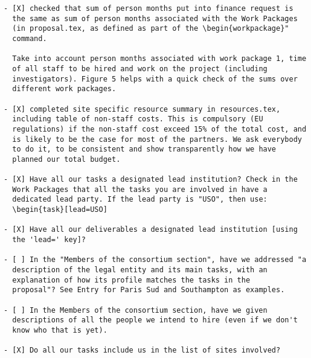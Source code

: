 \begin{draft}
\vspace{1cm}

\begin{verbatim}
- [X] checked that sum of person months put into finance request is
  the same as sum of person months associated with the Work Packages
  (in proposal.tex, as defined as part of the \begin{workpackage}"
  command.
  
  Take into account person months associated with work package 1, time
  of all staff to be hired and work on the project (including
  investigators). Figure 5 helps with a quick check of the sums over
  different work packages.

- [X] completed site specific resource summary in resources.tex,
  including table of non-staff costs. This is compulsory (EU
  regulations) if the non-staff cost exceed 15% of the total cost, and
  is likely to be the case for most of the partners. We ask everybody
  to do it, to be consistent and show transparently how we have
  planned our total budget.

- [X] Have all our tasks a designated lead institution? Check in the
  Work Packages that all the tasks you are involved in have a
  dedicated lead party. If the lead party is "USO", then use:
  \begin{task}[lead=USO]

- [X] Have all our deliverables a designated lead institution [using
  the 'lead=' key]?

- [ ] In the "Members of the consortium section", have we addressed "a
  description of the legal entity and its main tasks, with an
  explanation of how its profile matches the tasks in the
  proposal"? See Entry for Paris Sud and Southampton as examples.

- [ ] In the Members of the consortium section, have we given
  descriptions of all the people we intend to hire (even if we don't
  know who that is yet). 
  
- [X] Do all our tasks include us in the list of sites involved?
\end{verbatim}
\end{draft}




